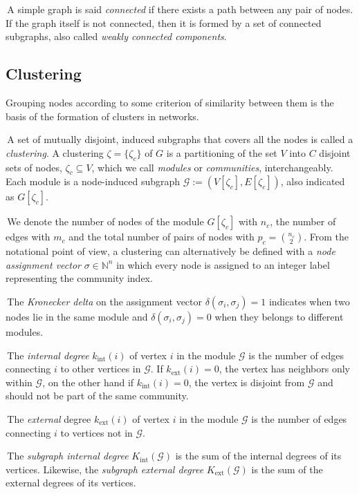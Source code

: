 \noindent\textbullet \,A simple graph is said \emph{connected} if there exists a path between any pair of nodes.
If the graph itself is not connected, then it is formed by a set of connected subgraphs, also called \emph{weakly connected components}.


\subsection{Clustering}\label{sec:clustering}
Grouping nodes according to some criterion of similarity between them is the basis of the formation of clusters in networks.

\noindent\textbullet \,A set of mutually disjoint, induced subgraphs that covers all the nodes is called a \emph{clustering}.
A clustering $\zeta = \{\zeta_c\}$ of $G$ is a partitioning of the set $V$ into $C$ disjoint sets of nodes, $\zeta_c \subseteq V$, which we call \emph{modules} or \emph{communities}, interchangeably.
Each module is a node-induced subgraph $\mathcal{G}:=(V[\zeta_c],E[\zeta_c])$, also indicated as $G[\zeta_c]$.

\noindent\textbullet \,We denote the number of nodes of the module $G[\zeta_c]$ with $n_c$, the number of edges with $m_c$ and the total number of pairs of nodes with $p_c=\binom{n_c}{2}$.
From the notational point of view, a clustering can alternatively be defined with a \emph{node assignment vector} $\sigma \in \mathbb{N}^n$ in which every node is assigned to an integer label representing the community index.


\noindent\textbullet \,The \emph{Kronecker delta} on the assignment vector $\delta(\sigma_i,\sigma_j)=1$ indicates when two nodes lie in the same module and $\delta(\sigma_i,\sigma_j)=0$ when they belongs to different modules.

\noindent\textbullet \,The \emph{internal degree} $k_{\textrm{int}}(i)$ of vertex $i$ in the module $\mathcal{G}$ is the number of edges connecting $i$ to other vertices in $\mathcal{G}$.
If $k_{\textrm{ext}}(i)=0$, the vertex has neighbors only within $\mathcal{G}$, on the other hand if $k_{\textrm{int}}(i)=0$, the vertex is disjoint from $\mathcal{G}$ and should not be part of the same community.

\noindent\textbullet \,The \emph{external} degree $k_{\textrm{ext}}(i)$ of vertex $i$ in the module $\mathcal{G}$ is the number of edges connecting $i$ to vertices not in $\mathcal{G}$.

\noindent\textbullet \,The \emph{subgraph internal degree} $K_{\textrm{int}}(\mathcal{G})$ is the sum of the internal degrees of its vertices.
Likewise, the \emph{subgraph external degree} $K_{\textrm{ext}}(\mathcal{G})$ is the sum of the external degrees of its vertices.


